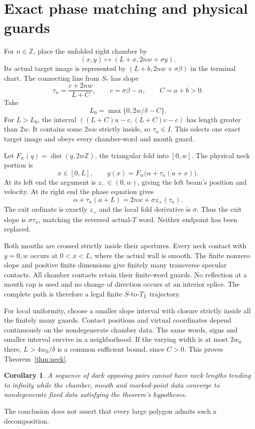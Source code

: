 \documentclass[11pt]{article}
\newtheorem{corollary}[theorem]{Corollary}
\theoremstyle{definition}
\newcommand{\Z}{\mathbb Z}
\newcommand{\dist}{\operatorname{dist}}
\begin{document}
\section{Exact phase matching and physical guards}
For $n\in\Z$, place the unfolded right chamber by
\[
 (x,y)\longmapsto(L+x,2nw+\sigma y).
\]
Its actual target image is represented by $(L+b,2nw+\sigma\beta)$ in the terminal chart. The connecting line from $S_*$ has slope
\[
 \tau_n=\frac{c+2nw}{L+C},\qquad c=\sigma\beta-\alpha,\qquad C=a+b>0.
\]
Take
\[
 L_0=\max\{0,2w/\delta-C\}.
\]
For $L>L_0$, the interval $((L+C)u-c,(L+C)v-c)$ has length greater than $2w$. It contains some $2nw$ strictly inside, so $\tau_n\in I$. This selects one exact target image and obeys every chamber-word and mouth guard.

Let $F_w(q)=\dist(q,2w\Z)$, the triangular fold into $[0,w]$. The physical neck portion is
\[
 x\in[0,L],\qquad y(x)=F_w\bigl(\alpha+\tau_n(a+x)\bigr).
\]
At its left end the argument is $z_-\in(0,w)$, giving the left beam's position and velocity. At its right end the phase equation gives
\[
 \alpha+\tau_n(a+L)=2nw+\sigma z_+(\tau_n).
\]
The exit ordinate is exactly $z_+$ and the local fold derivative is $\sigma$. Thus the exit slope is $\sigma\tau_n$, matching the reversed actual-$T$ word. Neither endpoint has been replaced.

Both mouths are crossed strictly inside their apertures. Every neck contact with $y=0,w$ occurs at $0<x<L$, where the actual wall is smooth. The finite nonzero slope and positive finite dimensions give finitely many transverse specular contacts. All chamber contacts retain their finite-word guards. No reflection at a mouth cap is used and no change of direction occurs at an interior splice. The complete path is therefore a legal finite $S$-to-$T_L$ trajectory.

For local uniformity, choose a smaller slope interval with closure strictly inside all the finitely many guards. Contact positions and virtual coordinates depend continuously on the nondegenerate chamber data. The same words, signs and smaller interval survive in a neighborhood. If the varying width is at most $2w_0$ there, $L>4w_0/\delta$ is a common sufficient bound, since $C>0$. This proves Theorem~\ref{thm:neck}.

\begin{corollary}
A sequence of dark opposing pairs cannot have neck lengths tending to infinity while the chamber, mouth and marked-point data converge to nondegenerate fixed data satisfying the theorem's hypotheses.
\end{corollary}
The conclusion does not assert that every large polygon admits such a decomposition.
\end{document}
